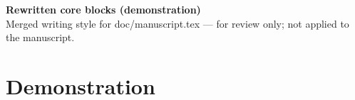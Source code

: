 \documentclass[11pt]{article}
\begin{document}
\begin{center}
{\Large\bfseries Rewritten core blocks (demonstration)}\\[2mm]
{\small Merged writing style for doc/manuscript.tex --- for review only; not
applied to the manuscript.}
\end{center}
\vspace{4mm}

\section{Demonstration}

\end{document}

